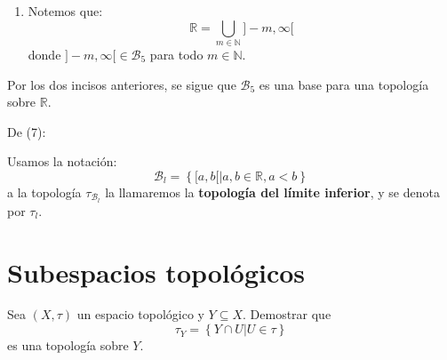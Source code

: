 \documentclass[12pt]{report}
\theoremstyle{largebreak}
\begin{document}
\begin{sol}
\begin{enumerate}
            \item Notemos que:
            \begin{equation*}
                \mathbb{R}=\bigcup_{m\in\mathbb{N}}]-m,\infty[
            \end{equation*}
            donde $]-m,\infty[\in\mathcal{B}_5$ para todo $m\in\mathbb{N}$.
        \end{enumerate}

        Por los dos incisos anteriores, se sigue que $\mathcal{B}_5$ es una base para una topología sobre $\mathbb{R}$.

        De (7):
    \end{sol}

    \begin{obs}
        Usamos la notación:
        \begin{equation*}
            \mathcal{B}_l=\left\{[a,b[\Big|a,b\in\mathbb{R},a<b \right\}
        \end{equation*}
        a la topología $\tau_{\mathcal{B}_l}$ la llamaremos la \textbf{topología del límite inferior}, y se denota por $\tau_l$.
    \end{obs}

    \section{Subespacios topológicos}

    \begin{excer}
        Sea $(X,\tau)$ un espacio topológico y $Y\subseteq X$. Demostrar que
        \begin{equation*}
            \tau_Y=\left\{Y\cap U\Big|U\in\tau \right\}
        \end{equation*}
        es una topología sobre $Y$.
    \end{excer}
\end{document}
